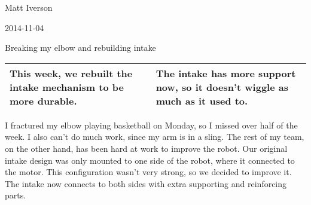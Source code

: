 Matt Iverson

2014-11-04

Breaking my elbow and rebuilding intake

\begin{tabular}{|p{5cm}|p{5cm}|}
 \hline
 This week, we rebuilt the intake mechanism to be more durable.
&
 The intake has more support now, so it doesn't wiggle as much as it used to.
\\
 \hline
\end{tabular}

I fractured my elbow playing basketball on Monday, so I missed over half of the week. I also can't do much work, since my arm is in a sling. The rest of my team, on the other hand, has been hard at work to improve the robot. Our original intake design was only mounted to one side of the robot, where it connected to the motor. This configuration wasn't very strong, so we decided to improve it. The intake now connects to both sides with extra supporting and reinforcing parts.

